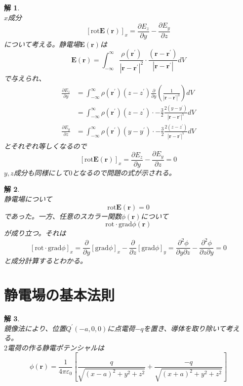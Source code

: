 \documentclass{jsarticle}
\newtheorem{ans}{解}[section]
\begin{document}
\begin{ans}~\\
\(x\)成分
\[\left[\mathrm{rot}\bm{E}(\bm{r})\right]_{x}=\frac{\partial E_{z}}{\partial y}-\frac{\partial E_{y}}{\partial z}\]
について考える。静電場\(\bm{E}(\bm{r})\)は
\[\bm{E}(\bm{r})=\int_{-\infty}^{\infty}\frac{\rho({\bm{r}}^{\prime})}{\left|\bm{r}-{\bm{r}}^{\prime}\right|^{2}}\cdot\frac{(\bm{r}-{\bm{r}}^{\prime})}{\left|\bm{r}-{\bm{r}}^{\prime}\right|}dV\]
で与えられ、
\begin{align*}
\frac{\partial E_{z}}{\partial y}&=\int_{-\infty}^{\infty}\rho({\bm{r}}^{\prime})(z-z^{\prime})\frac{\partial}{\partial y}\left(\frac{1}{\left|\bm{r}-{\bm{r}}^{\prime}\right|^{3}}\right)dV\\
&=\int_{-\infty}^{\infty}\rho({\bm{r}}^{\prime})(z-z^{\prime})\cdot-\frac{3}{2}\frac{2(y-y^{\prime})}{\left|\bm{r}-{\bm{r}}^{\prime}\right|^{5}}dV\\
\frac{\partial E_{y}}{\partial z}&=\int_{-\infty}^{\infty}\rho({\bm{r}}^{\prime})(y-y^{\prime})\cdot-\frac{3}{2}\frac{2(z-z^{\prime})}{\left|\bm{r}-{\bm{r}}^{\prime}\right|^{5}}dV
\end{align*}
とそれぞれ等しくなるので
\[\left[\mathrm{rot}\bm{E}(\bm{r})\right]_{x}=\frac{\partial E_{z}}{\partial y}-\frac{\partial E_{y}}{\partial z}=0\]
\(y,z\)成分も同様にして\(0\)となるので問題の式が示される。
\end{ans}

\begin{ans}~\\
静電場について
\[\mathrm{rot}\bm{E}(\bm{r})=0\]
であった。一方、任意のスカラー関数\(\phi(\bm{r})\)について
\[\mathrm{rot}\cdot\mathrm{grad}\phi(\bm{r})\]
が成り立つ。それは
\[\left[\mathrm{rot}\cdot\mathrm{grad}\phi\right]_{x}=\frac{\partial}{\partial y}\left[\mathrm{grad}\phi\right]_{x}-\frac{\partial}{\partial z}\left[\mathrm{grad}\phi\right]_{y}=\frac{\partial^{2}\phi}{\partial y\partial z}-\frac{\partial^{2}\phi}{\partial z\partial y}=0\]
と成分計算するとわかる。
\end{ans}




\section{静電場の基本法則}
\noindent



\begin{ans}~\\
鏡像法により、位置\(Q^{\prime}(-a, 0, 0)\)に点電荷\(-q\)を置き、導体を取り除いて考える。\\
\(2\)電荷の作る静電ポテンシャルは
\[\phi(\bm{r})=\frac{1}{4\pi\varepsilon_{0}}\left[\frac{q}{\sqrt{(x-a)^{2}+y^{2}+z^{2}}}+\frac{-q}{\sqrt{(x+a)^{2}+y^{2}+z^{2}}}\right]\]
\end{ans}
\end{document}
